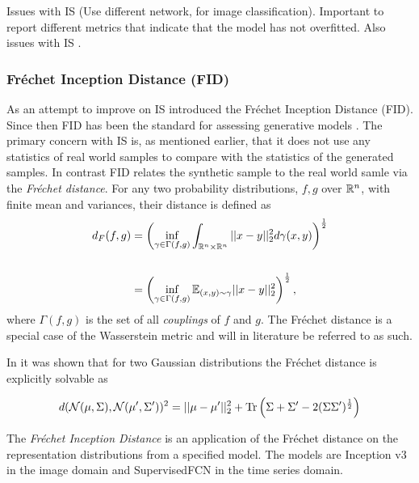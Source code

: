 \documentclass[../../thesis.tex]{subfiles}
\begin{document}
Issues with IS \cite{barratt2018note} (Use different network, for image classification).  Important to report different metrics that indicate that the model has not overfitted. 
Also issues with IS \cite{borji2021pros}.\newline



\subsubsection{Fréchet Inception Distance (FID)}
As an attempt to improve on IS \cite{heusel2018gans} introduced the Fréchet Inception Distance (FID). Since then FID has been the standard for assessing generative models \cite{borji2021pros}.\newline
The primary concern with IS is, as mentioned earlier, that it does not use any statistics of real world samples to compare with the statistics of the generated samples. In contrast FID relates the synthetic sample to the real world samle via the \textit{Fréchet distance}. For any two probability distributions, $f,g$ over $\mathbb{R}^n$, with finite mean and variances, their  distance is defined as 
\begin{equation}
    \begin{aligned}
        d_F(f,g) &= \left(\inf_{\gamma \in \Gamma(f,g)} \int_{\mathbb{R}^n\times\mathbb{R}^n}||x-y||_2^2d\gamma(x,y) \right)^{\frac{1}{2}}\\\\
            &= \left(\inf_{\gamma \in \Gamma(f,g)} \mathbb{E}_{(x,y)\sim \gamma} ||x-y||_2^2\right)^{\frac{1}{2}},
    \end{aligned}
\end{equation}
where $\Gamma(f,g)$ is the set of all \textit{couplings} of $f$ and $g$. The Fréchet distance is a special case of the Wasserstein metric and will in literature be referred to as such.\newline 

In \cite{DOWSON1982450} it was shown that for two Gaussian distributions the Fréchet distance is explicitly solvable as

\begin{equation}
    \label{eq:FID Gaussian}
    d(\mathcal{N}(\mu,\Sigma),\mathcal{N}(\mu',\Sigma'))^2 = ||\mu-\mu'||_2^2 + \operatorname{Tr} \left( \Sigma + \Sigma' - 2(\Sigma\Sigma')^{\frac12}\right)
\end{equation}

The \textit{Fréchet Inception Distance} is an application of the Fréchet distance on the representation distributions from a specified model. The models are Inception v3 in the image domain and SupervisedFCN in the time series domain.\newline
\end{document}
